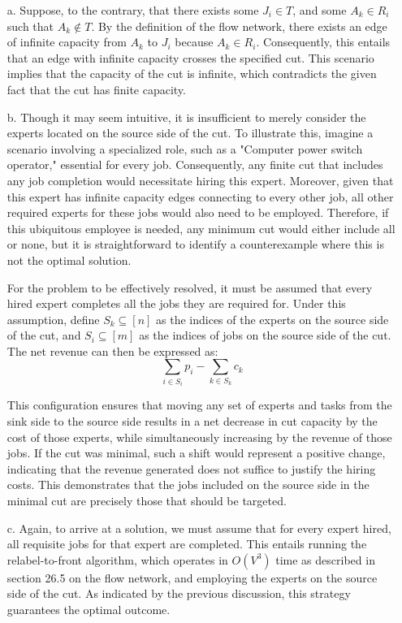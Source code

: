 \documentclass{article}
\begin{document}
\begin{enumerate}
    \item[a.] Suppose, to the contrary, that there exists some $J_i \in T$, and some $A_k \in R_i$ such that $A_k \notin T$. By the definition of the flow network, there exists an edge of infinite capacity from $A_k$ to $J_i$ because $A_k \in R_i$. Consequently, this entails that an edge with infinite capacity crosses the specified cut. This scenario implies that the capacity of the cut is infinite, which contradicts the given fact that the cut has finite capacity.
    \item[b.] Though it may seem intuitive, it is insufficient to merely consider the experts located on the source side of the cut. To illustrate this, imagine a scenario involving a specialized role, such as a "Computer power switch operator," essential for every job. Consequently, any finite cut that includes any job completion would necessitate hiring this expert. Moreover, given that this expert has infinite capacity edges connecting to every other job, all other required experts for these jobs would also need to be employed. Therefore, if this ubiquitous employee is needed, any minimum cut would either include all or none, but it is straightforward to identify a counterexample where this is not the optimal solution.

    For the problem to be effectively resolved, it must be assumed that every hired expert completes all the jobs they are required for. Under this assumption, define \(S_k \subseteq [n]\) as the indices of the experts on the source side of the cut, and \(S_i \subseteq [m]\) as the indices of jobs on the source side of the cut. The net revenue can then be expressed as:
    \begin{equation}
    \sum_{i \in S_i} p_i - \sum_{k \in S_k} c_k
    \end{equation}

    This configuration ensures that moving any set of experts and tasks from the sink side to the source side results in a net decrease in cut capacity by the cost of those experts, while simultaneously increasing by the revenue of those jobs. If the cut was minimal, such a shift would represent a positive change, indicating that the revenue generated does not suffice to justify the hiring costs. This demonstrates that the jobs included on the source side in the minimal cut are precisely those that should be targeted.
    \item[c.] Again, to arrive at a solution, we must assume that for every expert hired, all requisite jobs for that expert are completed. This entails running the relabel-to-front algorithm, which operates in $O(V^3)$ time as described in section 26.5 on the flow network, and employing the experts on the source side of the cut. As indicated by the previous discussion, this strategy guarantees the optimal outcome. 


\end{enumerate}
\end{document}
